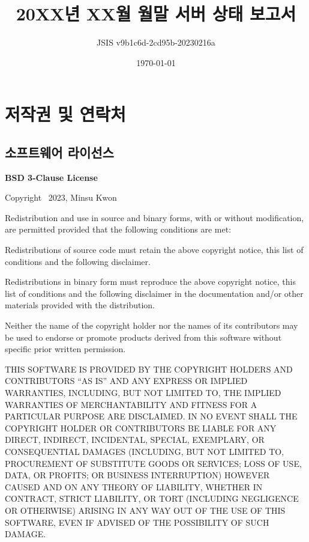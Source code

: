 \documentclass[12pt]{article}
\title{20XX년 XX월 월말 서버 상태 보고서}
\author{JSIS v9b1c6d-2cd95b-20230216a}
\date{\today}
\begin{document}
\maketitle


\section*{저작권 및 연락처}

\footnotesize %

\subsection*{소프트웨어 라이선스}

\textbf{BSD 3-Clause License}

Copyright \textcopyright\ 2023, Minsu Kwon

Redistribution and use in source and binary forms, with or without modification, are permitted provided that the following conditions are met:

Redistributions of source code must retain the above copyright notice, this list of conditions and the following disclaimer.

Redistributions in binary form must reproduce the above copyright notice, this list of conditions and the following disclaimer in the documentation and/or other materials provided with the distribution.

Neither the name of the copyright holder nor the names of its contributors may be used to endorse or promote products derived from this software without specific prior written permission.

THIS SOFTWARE IS PROVIDED BY THE COPYRIGHT HOLDERS AND CONTRIBUTORS ``AS IS'' AND ANY EXPRESS OR IMPLIED WARRANTIES, INCLUDING, BUT NOT LIMITED TO, THE IMPLIED WARRANTIES OF MERCHANTABILITY AND FITNESS FOR A PARTICULAR PURPOSE ARE DISCLAIMED. IN NO EVENT SHALL THE COPYRIGHT HOLDER OR CONTRIBUTORS BE LIABLE FOR ANY DIRECT, INDIRECT, INCIDENTAL, SPECIAL, EXEMPLARY, OR CONSEQUENTIAL DAMAGES (INCLUDING, BUT NOT LIMITED TO, PROCUREMENT OF SUBSTITUTE GOODS OR SERVICES; LOSS OF USE, DATA, OR PROFITS; OR BUSINESS INTERRUPTION) HOWEVER CAUSED AND ON ANY THEORY OF LIABILITY, WHETHER IN CONTRACT, STRICT LIABILITY, OR TORT (INCLUDING NEGLIGENCE OR OTHERWISE) ARISING IN ANY WAY OUT OF THE USE OF THIS SOFTWARE, EVEN IF ADVISED OF THE POSSIBILITY OF SUCH DAMAGE.
\end{document}
